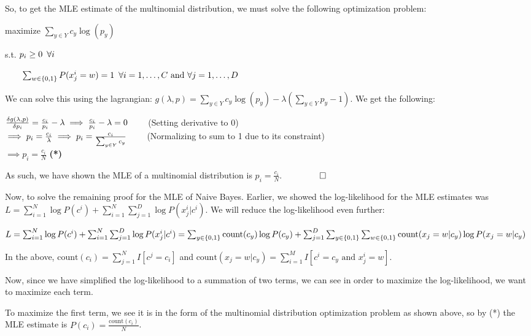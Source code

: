 So, to get the MLE estimate of the multinomial distribution, we must solve the following optimization problem:

maximize $\sum_{y \in Y} c_y \log(p_y)$

s.t. $p_i \geq 0 \thinspace\thinspace\thinspace \forall i$

$\qquad \sum_{w \in \{0, 1\}} P(x_j^i = w) = 1 \thinspace\thinspace\thinspace \forall i = 1, \dots, C \text{ and } \forall j = 1, \dots, D$

We can solve this using the lagrangian: $g(\lambda, p) = \sum_{y \in Y} c_y\log(p_y) - \lambda(\sum_{y \in Y} p_y - 1)$. We get the following:

$\frac{\delta g(\lambda, p)}{\delta p_i} = \frac{c_i}{p_i} - \lambda \\
\implies \frac{c_i}{p_i} - \lambda = 0 \qquad$ (Setting derivative to 0) \\
$\implies p_i = \frac{c_i}{\lambda} \\
\implies p_i = \frac{c_i}{\sum_{y \in Y} c_y} \qquad$ (Normalizing to sum to 1 due to its constraint) \\
$\implies p_i = \frac{c_i}{N}$ \textbf{(*)}

As such, we have shown the MLE of a multinomial distribution is $p_i = \frac{c_i}{N}$. $\qquad\qed$

Now, to solve the remaining proof for the MLE of Naive Bayes. Earlier, we showed the log-likelihood for the MLE estimates was $L = \sum_{i = 1}^N \log P(c^i) + \sum_{i = 1}^{N}\sum_{j = 1}^{D}\log P(x_j^i \vert c^i)$. We will reduce the log-likelihood even further:

$L = \sum_{i = 1}^N \log P(c^i) + \sum_{i = 1}^{N}\sum_{j = 1}^{D}\log P(x_j^i \vert c^i) \\
= \sum_{y \in \{0, 1\}} \text{count}(c_y)\log P(c_y) + \sum_{j = 1}^{D}\sum_{y \in \{0, 1\}}\sum_{w \in \{0, 1\}}\text{count}(x_j = w \vert c_y)\log P(x_j = w \vert c_y)$

In the above, $\text{count}(c_i) = \sum_{j = 1}^N I[c^j = c_i]$ and $\text{count}(x_j = w \vert c_y) = \sum_{i = 1}^M I[c^i = c_y \text{ and } x_j^i = w]$.

Now, since we have simplified the log-likelihood to a summation of two terms, we can see in order to maximize the log-likelihood, we want to maximize each term.

To maximize the first term, we see it is in the form of the multinomial distribution optimization problem as shown above, so by (*) the MLE estimate is $P(c_i) = \frac{\text{count}(c_i)}{N}$.

